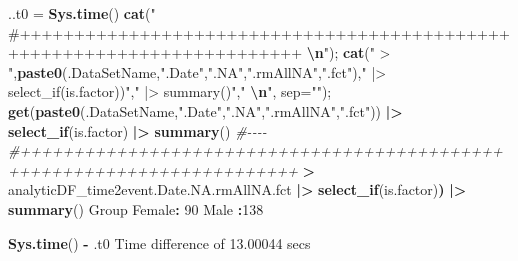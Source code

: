 \documentclass[
]{article}
\newenvironment{Shaded}{\begin{snugshade}}{\end{snugshade}}
\newcommand{\AttributeTok}[1]{\textcolor[rgb]{0.13,0.29,0.53}{#1}}
\newcommand{\CommentTok}[1]{\textcolor[rgb]{0.56,0.35,0.01}{\textit{#1}}}
\newcommand{\DecValTok}[1]{\textcolor[rgb]{0.00,0.00,0.81}{#1}}
\newcommand{\ErrorTok}[1]{\textcolor[rgb]{0.64,0.00,0.00}{\textbf{#1}}}
\newcommand{\FloatTok}[1]{\textcolor[rgb]{0.00,0.00,0.81}{#1}}
\newcommand{\FunctionTok}[1]{\textcolor[rgb]{0.13,0.29,0.53}{\textbf{#1}}}
\newcommand{\NormalTok}[1]{#1}
\newcommand{\OtherTok}[1]{\textcolor[rgb]{0.56,0.35,0.01}{#1}}
\newcommand{\SpecialCharTok}[1]{\textcolor[rgb]{0.81,0.36,0.00}{\textbf{#1}}}
\newcommand{\StringTok}[1]{\textcolor[rgb]{0.31,0.60,0.02}{#1}}
\begin{document}
\begin{Shaded}
\begin{Highlighting}[]

\NormalTok{..t0 }\OtherTok{=} \FunctionTok{Sys.time}\NormalTok{()}
\FunctionTok{cat}\NormalTok{(}\StringTok{"   \#++++++++++++++++++++++++++++++++++++++++++++++++++++++++++++++++++++++++    }\SpecialCharTok{\textbackslash{}n}\StringTok{"}\NormalTok{); }\FunctionTok{cat}\NormalTok{(}\StringTok{" \textgreater{} "}\NormalTok{,}\FunctionTok{paste0}\NormalTok{(.DataSetName,}\StringTok{".Date"}\NormalTok{,}\StringTok{".NA"}\NormalTok{,}\StringTok{".rmAllNA"}\NormalTok{,}\StringTok{".fct"}\NormalTok{),}\StringTok{" |\textgreater{} select\_if(is.factor))"}\NormalTok{,}\StringTok{" |\textgreater{} summary()"}\NormalTok{,}\StringTok{"  }\SpecialCharTok{\textbackslash{}n}\StringTok{"}\NormalTok{, }\AttributeTok{sep=}\StringTok{""}\NormalTok{); }\FunctionTok{get}\NormalTok{(}\FunctionTok{paste0}\NormalTok{(.DataSetName,}\StringTok{".Date"}\NormalTok{,}\StringTok{".NA"}\NormalTok{,}\StringTok{".rmAllNA"}\NormalTok{,}\StringTok{".fct"}\NormalTok{)) }\SpecialCharTok{|\textgreater{}} \FunctionTok{select\_if}\NormalTok{(is.factor) }\SpecialCharTok{|\textgreater{}} \FunctionTok{summary}\NormalTok{() }\CommentTok{\#{-}{-}{-}{-}  }
   \CommentTok{\#++++++++++++++++++++++++++++++++++++++++++++++++++++++++++++++++++++++++    }
 \SpecialCharTok{\textgreater{}}\NormalTok{ analyticDF\_time2event.Date.NA.rmAllNA.fct }\SpecialCharTok{|\textgreater{}} \FunctionTok{select\_if}\NormalTok{(is.factor)}\ErrorTok{)} \SpecialCharTok{|\textgreater{}} \FunctionTok{summary}\NormalTok{()  }
\NormalTok{    Group    }
\NormalTok{ Female}\SpecialCharTok{:} \DecValTok{90}  
\NormalTok{ Male  }\SpecialCharTok{:}\DecValTok{138}  
\end{Highlighting}
\end{Shaded}

\begin{Shaded}
\begin{Highlighting}[]
\FunctionTok{Sys.time}\NormalTok{() }\SpecialCharTok{{-}}\NormalTok{ .t0}
\NormalTok{Time difference of }\FloatTok{13.00044}\NormalTok{ secs}
\end{Highlighting}
\end{Shaded}
\end{document}
